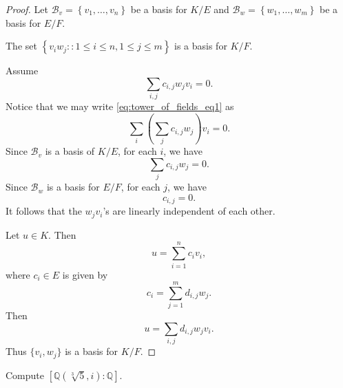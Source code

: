 \documentclass[notoc,notitlepage,nobib]{tufte-book}
\begin{document}
\begin{proof}
  Let $\mathcal{B}_v = \left\{ v_1, \ldots, v_n \right\}$ be a basis for $K / E$ and
  $\mathcal{B}_w = \left\{ w_1, \ldots, w_m \right\}$ be a basis for $E / F$.

  \noindent
   The set $\left\{ v_i w_j : :1 \leq i \leq n, 1 \leq j \leq m \right\}$
  is a basis for $K / F$.

  \noindent
   Assume
  \begin{equation}\label{eq:tower_of_fields_eq1}
    \sum_{i, j} c_{i, j} w_j v_i = 0.
  \end{equation}
  Notice that we may write \cref{eq:tower_of_fields_eq1} as
  \begin{equation*}
    \sum_{i} \left( \sum_{j} c_{i, j} w_j \right) v_i = 0.
  \end{equation*}
  Since $\mathcal{B}_v$ is a basis of $K / E$, for each $i$, we have
  \begin{equation*}
    \sum_{j} c_{i, j} w_j = 0.
  \end{equation*}
  Since $\mathcal{B}_w$ is a basis for $E / F$, for each $j$, we have
  \begin{equation*}
    c_{i, j} = 0.
  \end{equation*}
  It follows that the $w_j v_i$'s are linearly independent of each other.

  \noindent
   Let $u \in K$. Then
  \begin{equation*}
    u = \sum_{i=1}^{n} c_i v_i,
  \end{equation*}
  where $c_i \in E$ is given by
  \begin{equation*}
    c_i = \sum_{j=1}^{m} d_{i, j} w_j.
  \end{equation*}
  Then
  \begin{equation*}
    u = \sum_{i, j} d_{i, j} w_j v_i.
  \end{equation*}
  Thus $\{ v_i, w_j \}$ is a basis for $K / F$.
\end{proof}

\begin{eg}
  Compute $[\mathbb{Q}(\sqrt[3]{5}, i) : \mathbb{Q}]$.
\end{eg}
\end{document}
